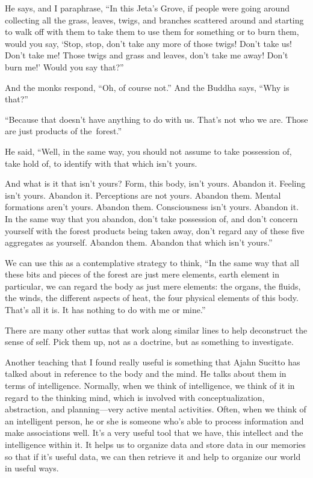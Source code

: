 He says, and I paraphrase, ``In this Jeta's Grove, if people were going around collecting all the grass, leaves, twigs, and branches scattered around and starting to walk off with them to take them to use them for something or to burn them, would you say, `Stop, stop, don't take any more of those twigs! Don't take us! Don't take me! Those twigs and grass and leaves, don't take me away! Don't burn me!' Would you say that?''

And the monks respond, ``Oh, of course not.'' And the Buddha says, ``Why is that?''

``Because that doesn't have anything to do with us. That's not who we are. Those are just products of \mbox{the forest.''}

He said, ``Well, in the same way, you should not assume to take possession of, take hold of, to identify with \linebreak that which isn't yours.

And what is it that isn't yours? Form, this body, isn't yours. Abandon it. Feeling isn't yours. Abandon it. Perceptions are not yours. Abandon them. Mental formations aren't yours. Abandon them. Consciousness isn't yours. Abandon it. In the same way that you abandon, don't take possession of, and don't concern yourself with the forest products being taken away, don't regard any of these five aggregates as yourself. Abandon them. Abandon that which isn't yours.''

We can use this as a contemplative strategy to think, ``In the same way that all these bits and pieces of the forest are just mere elements, earth element in particular, we can regard the body as just mere elements: the organs, the fluids, the winds, the different aspects of heat, the four physical elements of this body. That's all it is. It has nothing to do with me or mine.''

{\parfillskip=0pt
There are many other suttas that work along similar lines to help deconstruct the sense of self. Pick them up, not as a doctrine, but as something to investigate.
\par}

Another teaching that I found really useful is something that Ajahn Sucitto has talked about in reference to the body and the mind. He talks about them in terms of intelligence. Normally, when we think of intelligence, we think of it in regard to the thinking mind, which is involved with conceptualization, abstraction, and planning---very active mental activities. Often, when we think of an intelligent person, he or she is someone who's able to process information and make associations well. It's a very useful tool that we have, this intellect and the intelligence within it. It helps us to organize data and store data in our memories so that if it's useful data, we can then retrieve it and help to organize our world in useful ways.

